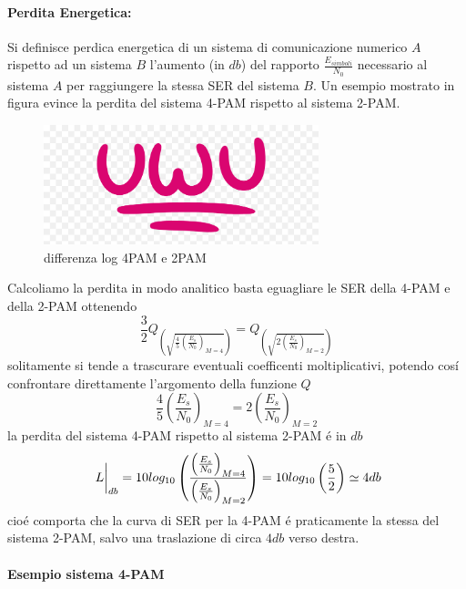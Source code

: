             \paragraph{Perdita Energetica: } Si definisce perdica energetica di un sistema di comunicazione numerico $A$ rispetto
                ad un sistema $B$ l'aumento (in $db$) del rapporto $\frac{E_{simboli}}{N_0}$ necessario al sistema $A$ per 
                raggiungere la stessa SER del sistema $B$. Un esempio mostrato in figura evince la perdita del sistema 
                4-PAM rispetto al sistema 2-PAM.
                \begin{figure}[H]
                    \centering
                    \includegraphics*[width = 8cm]{media/uwu.png}
                    \caption{differenza log 4PAM e 2PAM}
                \end{figure}  
                Calcoliamo la perdita in modo analitico basta eguagliare le SER della 4-PAM e della
                2-PAM ottenendo
                \[
                    \frac{3}{2}Q_{\displaystyle\left(\sqrt{\frac{4}{5}\left(\frac{E_s}{N_0}\right)_{M=4}}\right)} =Q_{\displaystyle\left(\sqrt{2\left(\frac{E_s}{N_0}\right)_{M=2}}\right)}      
                \]
                solitamente si tende a trascurare eventuali coefficenti moltiplicativi, potendo cosí confrontare direttamente
                l'argomento della funzione $Q$
                \[
                    \frac{4}{5}\left(\frac{E_s}{N_0}\right)_{M=4} =2\left(\frac{E_s}{N_0}\right)_{M=2}          
                \]
                la perdita del sistema 4-PAM rispetto al sistema 2-PAM é in $db$
                \[
                    \eval*{L}_{db} = 10log_{10}\left(\frac{\left(\frac{E_s}{N_0}\right)_{M=4}}{\left(\frac{E_s}{N_0}\right)_{M=2}}\right) = 10log_{10}\left(\frac{5}{2}\right) \simeq 4db    
                \]
                cioé comporta che la curva di SER per la 4-PAM é praticamente la stessa del sistema 2-PAM, salvo una traslazione di
                circa $4db$ verso destra.
            \paragraph{Esempio sistema 4-PAM}{

            }
